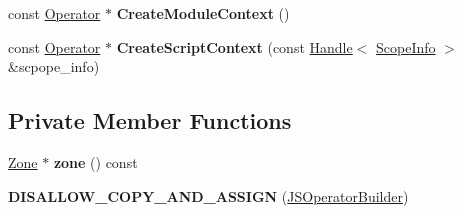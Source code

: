\begin{DoxyCompactItemize}
\item 
const \hyperlink{classv8_1_1internal_1_1compiler_1_1_operator}{Operator} $\ast$ {\bfseries Create\+Module\+Context} ()\hypertarget{classv8_1_1internal_1_1compiler_1_1_j_s_operator_builder_a3ca0209eb4a6646076960a277ff2c03c}{}\label{classv8_1_1internal_1_1compiler_1_1_j_s_operator_builder_a3ca0209eb4a6646076960a277ff2c03c}

\item 
const \hyperlink{classv8_1_1internal_1_1compiler_1_1_operator}{Operator} $\ast$ {\bfseries Create\+Script\+Context} (const \hyperlink{classv8_1_1internal_1_1_handle}{Handle}$<$ \hyperlink{classv8_1_1internal_1_1_scope_info}{Scope\+Info} $>$ \&scpope\+\_\+info)\hypertarget{classv8_1_1internal_1_1compiler_1_1_j_s_operator_builder_ad55ae0544bbd61f378a1808763f586ea}{}\label{classv8_1_1internal_1_1compiler_1_1_j_s_operator_builder_ad55ae0544bbd61f378a1808763f586ea}

\end{DoxyCompactItemize}
\subsection*{Private Member Functions}
\begin{DoxyCompactItemize}
\item 
\hyperlink{classv8_1_1internal_1_1_zone}{Zone} $\ast$ {\bfseries zone} () const \hypertarget{classv8_1_1internal_1_1compiler_1_1_j_s_operator_builder_a2cc6c59c4bc838f77b694ec1a26ea09d}{}\label{classv8_1_1internal_1_1compiler_1_1_j_s_operator_builder_a2cc6c59c4bc838f77b694ec1a26ea09d}

\item 
{\bfseries D\+I\+S\+A\+L\+L\+O\+W\+\_\+\+C\+O\+P\+Y\+\_\+\+A\+N\+D\+\_\+\+A\+S\+S\+I\+GN} (\hyperlink{classv8_1_1internal_1_1compiler_1_1_j_s_operator_builder}{J\+S\+Operator\+Builder})\hypertarget{classv8_1_1internal_1_1compiler_1_1_j_s_operator_builder_a9d6e01ded9d7a378bc658b783162ee66}{}\label{classv8_1_1internal_1_1compiler_1_1_j_s_operator_builder_a9d6e01ded9d7a378bc658b783162ee66}

\end{DoxyCompactItemize}
